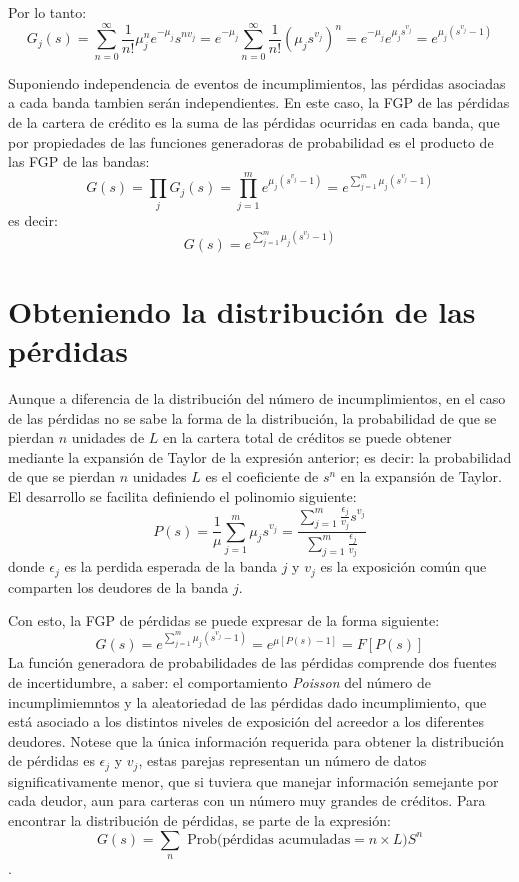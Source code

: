 \documentclass[
  12pt,
]{krantz}
\theoremstyle{definition}
\theoremstyle{definition}
\theoremstyle{definition}
\theoremstyle{remark}
\begin{document}
Por lo tanto:\[G_j(s)=\sum_{n=0}^\infty \frac{1}{n!}\mu_j^ne^{-\mu_j}s^{nv_j}=e^{-\mu_j}\sum_{n=0}^\infty \frac{1}{n!}(\mu_js^{v_j})^n=e^{-\mu_j}e^{\mu_js^{v_j}}=e^{\mu_j(s^{v_j}-1)}\]

Suponiendo independencia de eventos de incumplimientos, las pérdidas asociadas a cada banda tambien serán independientes. En este caso, la FGP de las pérdidas de la cartera de crédito es la suma de las pérdidas ocurridas en cada banda, que por propiedades de las funciones generadoras de probabilidad es el producto de las FGP de las bandas:\[G(s)=\prod_jG_j(s)=\prod_{j=1}^me^{\mu_j(s^{v_j}-1)}=e^{\sum_{j=1}^m\mu_j(s^{v_j}-1)}\]es decir:\[G(s)=e^{\sum_{j=1}^m\mu_j(s^{v_j}-1)}\]

\hypertarget{obteniendo-la-distribucion-de-las-perdidas}{%
\section{Obteniendo la distribución de las pérdidas}\label{obteniendo-la-distribucion-de-las-perdidas}}

Aunque a diferencia de la distribución del número de incumplimientos, en el caso de las pérdidas no se sabe la forma de la distribución, la probabilidad de que se pierdan \(n\) unidades de \(L\) en la cartera total de créditos se puede obtener mediante la expansión de Taylor de la expresión anterior; es decir: la probabilidad de que se pierdan \(n\) unidades \(L\) es el coeficiente de \(s^n\) en la expansión de Taylor. El desarrollo se facilita definiendo el polinomio siguiente:\[P(s)=\frac{1}{\mu}\sum_{j=1}^m\mu_js^{v_j}=\frac{\sum_{j=1}^m\frac{\epsilon_j}{{v_j}}s^{v_j}}{\sum_{j=1}^m\frac{\epsilon_j}{{v_j}}}\] donde \(\epsilon_j\) es la perdida esperada de la banda \(j\) y \(v_j\) es la exposición común que comparten los deudores de la banda \(j\).

Con esto, la FGP de pérdidas se puede expresar de la forma siguiente:\[G(s)=e^{\sum_{j=1}^m\mu_j(s^{v_j}-1)}=e^{\mu[P(s)-1]}=F[P(s)]\]
La función generadora de probabilidades de las pérdidas comprende dos fuentes de incertidumbre, a saber: el comportamiento \emph{Poisson} del número de incumplimiemntos y la aleatoriedad de las pérdidas dado incumplimiento, que está asociado a los distintos niveles de exposición del acreedor a los diferentes deudores. Notese que la única información requerida para obtener la distribución de pérdidas es \(\epsilon_j\) y \(v_j\), estas parejas representan un número de datos significativamente menor, que si tuviera que manejar información semejante por cada deudor, aun para carteras con un número muy grandes de créditos.
Para encontrar la distribución de pérdidas, se parte de la expresión:\[G(s)=\sum_n\textrm{ Prob(pérdidas acumuladas}=n\times L)S^n \].
\end{document}
